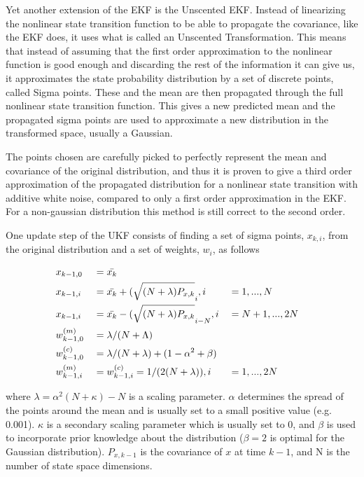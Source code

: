 Yet another extension of the EKF is the Unscented EKF\cite{UKF}. Instead of linearizing the nonlinear state transition function to be able to propagate the covariance, like the EKF does, it uses what is called an Unscented Transformation\cite{UTrans}. This means that instead of assuming that the first order approximation to the nonlinear function is good enough and discarding the rest of the information it can give us, it approximates the state probability distribution by a set of discrete points, called Sigma points. These and the mean are then propagated through the full nonlinear state transition function. This gives a new predicted mean and the propagated sigma points are used to approximate a new distribution in the transformed space, usually a Gaussian. 

The points chosen are carefully picked to perfectly represent the mean and covariance of the original distribution, and thus it is proven to give a third order approximation of the propagated distribution for a nonlinear state transition with additive white noise, compared to only a first order approximation in the EKF. For a non-gaussian distribution this method is still correct to the second order.

One update step of the UKF consists of finding a set of sigma points, $x_{k,i}$, from the original distribution and a set of weights, $w_i$, as follows

\begin{alignat*}{3}
    & x_{k-1,0} &&= \Bar{x_k} \\
    & x_{k-1,i} &&= \Bar{x_k} + (\sqrt{(N+\lambda)P_{x,k}}_i, i &&= 1,...,N \\
    & x_{k-1,i} &&= \Bar{x_k} - (\sqrt{(N+\lambda)P_{x,k}}_{i-N}, i &&=N + 1,...,2N \\
    & w_{k-1,0}^{(m)} &&= \lambda/(N+\Lambda) \\ 
    & w_{k-1,0}^{(c)} &&= \lambda/(N+\lambda) + (1-\alpha^2 + \beta) \\
    & w_{k-1,i}^{(m)} &&= w_{k-1,i}^{(c)} = 1/(2(N+\lambda)), i &&= 1,...,2N
\end{alignat*}

where $\lambda = \alpha^2(N+\kappa) - N$ is a scaling parameter. $\alpha$ determines the spread of the points around the mean and is usually set to a small positive value (e.g. 0.001). $\kappa$ is a secondary scaling parameter which is usually set to 0, and $\beta$ is used to incorporate prior knowledge about the distribution ($\beta=2$ is optimal for the Gaussian distribution). $P_{x,k-1}$ is the covariance of $x$ at time $k-1$, and N is the number of state space dimensions. 

